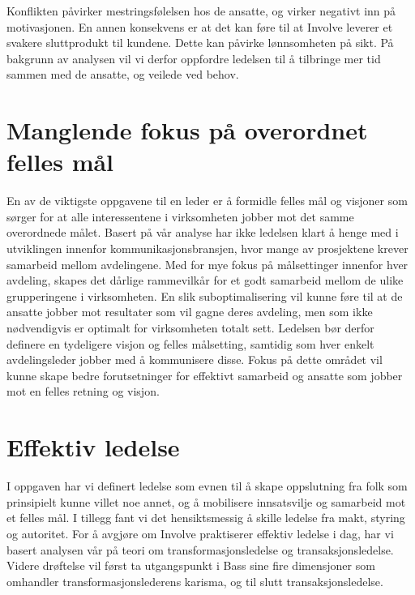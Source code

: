 \indent \newline
Konflikten påvirker mestringsfølelsen hos de ansatte, og virker negativt inn på motivasjonen. En annen konsekvens er at det kan føre til at Involve leverer et svakere sluttprodukt til kundene. Dette kan påvirke lønnsomheten på sikt. På bakgrunn av analysen vil vi derfor oppfordre ledelsen til å tilbringe mer tid sammen med de ansatte, og veilede ved behov. 

\section{Manglende fokus på overordnet felles mål}
En av de viktigste oppgavene til en leder er å formidle felles mål og visjoner som sørger for at alle interessentene i virksomheten jobber mot det samme overordnede målet. Basert på vår analyse har ikke ledelsen klart å henge med i utviklingen innenfor kommunikasjonsbransjen, hvor mange av prosjektene krever samarbeid mellom avdelingene. Med for mye fokus på målsettinger innenfor hver avdeling, skapes det dårlige rammevilkår for et godt samarbeid mellom de ulike grupperingene i virksomheten. En slik suboptimalisering vil kunne føre til at de ansatte jobber mot resultater som vil gagne deres avdeling, men som ikke nødvendigvis er optimalt for virksomheten totalt sett. Ledelsen bør derfor definere en tydeligere visjon og felles målsetting, samtidig som hver enkelt avdelingsleder jobber med å kommunisere disse. Fokus på dette området vil kunne skape bedre forutsetninger for effektivt samarbeid og ansatte som jobber mot en felles retning og visjon. 

\section{Effektiv ledelse}
I oppgaven har vi definert ledelse som evnen til å skape oppslutning fra folk som prinsipielt kunne villet noe annet, og å mobilisere innsatsvilje og samarbeid mot et felles mål. I tillegg fant vi det hensiktsmessig å skille ledelse fra makt, styring og autoritet. For å avgjøre om Involve praktiserer effektiv ledelse i dag, har vi basert analysen vår på teori om transformasjonsledelse og transaksjonsledelse. Videre drøftelse vil først ta utgangspunkt i Bass sine fire dimensjoner som omhandler transformasjonslederens karisma, og til slutt transaksjonsledelse.

